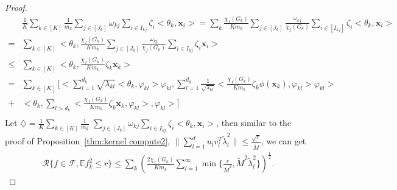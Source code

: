 \documentclass{article}
\def\vx{{\mathbf{x}}}
\def\eE{\mathbb{E}}
\begin{document}
\begin{proof}
\begin{align*}
     & \frac{1}{K} \sum _{k \in [K]} \frac{1}{m_k} \sum _{j \in [J_k]} \omega_{kj} \sum _{i \in I_{kj}} \zeta _i <\theta_k, \vx_i> 
    = \sum_k \frac{\chi_f(G_k)}{K m_k} \sum_{j \in [J_k]} \frac{\omega_{kj}}{\chi_f(G_k)} \sum_{i \in [I_{kj}]} \zeta_i < \theta_k, \vx_i > \\
    = &  \sum _{k \in [K]}  <\theta_k, \frac{\chi _f(G_k)}{K m_k} \sum _{j \in [J_k]} \frac{\omega_{kj}}{\chi _f(G_k)} \sum _{i \in I_{kj}} \zeta_i \vx_i> \\  
     \leq & \sum _{k \in [K]}  <\theta_k, \frac{\chi _f(G_k)}{K m_k} \zeta_k \vx_k > \\
     =  & \sum _{k \in [K]} [ <\sum _{l = 1}^{d_k} \sqrt{\lambda _{kl}}<\theta_k, \varphi _{kl}>\varphi _{kl} , \sum _{l = 1}^{d_k} \frac{1}{\sqrt{ \lambda _{kl}}} <\frac{\chi_f(G_k)}{K m_k} \zeta_k \phi (\vx_k) , \varphi _{kl} > \varphi _{kl}> \\ + & <\theta_k, \sum _{l > d_k} <\frac{\chi_f(G_k)}{K m_k} \zeta_k \vx_k, \varphi _{kl} >, \varphi _{kl}>] \\ 
\end{align*}
Let $\diamondsuit = \frac{1}{K} \sum _{k \in [K]} \frac{1}{m_k}$ $ \sum _{j \in [J_k]} \omega_{kj} \sum _{i \in I_{kj}} \zeta _i <\theta_k, \vx_i>$, then similar to the proof of Proposition~\ref{thm:kernel compute2},
$\| \sum _{l=1}^{d} u_{l} v_{l}^T \widetilde{\lambda} _{l}^2 \| \leq \frac{\sqrt{r}}{\widetilde{M}}$, we can get
\begin{align*}
    \mathcal{R}\{ f \in \mathcal{F}, \eE f_k^2 \leq r \} \leq  \sum_k \left( \frac{2 \chi_f(G_k)}{K m_k} \sum _{l = 1} ^{\infty} \min \{ \frac{r}{\bar{M}^2} , \widetilde{M}^2 \widetilde{\lambda} ^2_{l} \} \right)^{\frac{1}{2}}.
\end{align*}
\end{proof}
\end{document}
